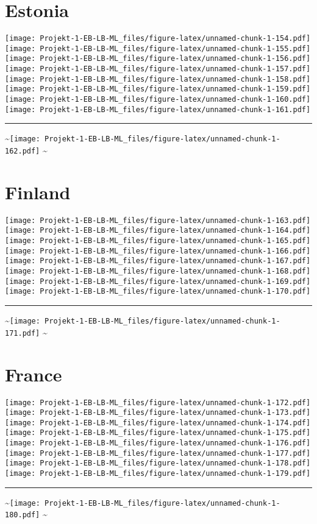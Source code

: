 \documentclass[]{article}
\begin{document}
\section{Estonia}\label{estonia}

\texttt{[image: Projekt-1-EB-LB-ML\_files/figure-latex/unnamed-chunk-1-154.pdf]}
\texttt{[image: Projekt-1-EB-LB-ML\_files/figure-latex/unnamed-chunk-1-155.pdf]}
\texttt{[image: Projekt-1-EB-LB-ML\_files/figure-latex/unnamed-chunk-1-156.pdf]}
\texttt{[image: Projekt-1-EB-LB-ML\_files/figure-latex/unnamed-chunk-1-157.pdf]}
\texttt{[image: Projekt-1-EB-LB-ML\_files/figure-latex/unnamed-chunk-1-158.pdf]}
\texttt{[image: Projekt-1-EB-LB-ML\_files/figure-latex/unnamed-chunk-1-159.pdf]}
\texttt{[image: Projekt-1-EB-LB-ML\_files/figure-latex/unnamed-chunk-1-160.pdf]}
\texttt{[image: Projekt-1-EB-LB-ML\_files/figure-latex/unnamed-chunk-1-161.pdf]}
\bigskip\hrule\bigskip
\textasciitilde{}\hfill\texttt{[image: Projekt-1-EB-LB-ML\_files/figure-latex/unnamed-chunk-1-162.pdf]}
\hfill \textasciitilde{} \vfill\eject

\section{Finland}\label{finland}

\texttt{[image: Projekt-1-EB-LB-ML\_files/figure-latex/unnamed-chunk-1-163.pdf]}
\texttt{[image: Projekt-1-EB-LB-ML\_files/figure-latex/unnamed-chunk-1-164.pdf]}
\texttt{[image: Projekt-1-EB-LB-ML\_files/figure-latex/unnamed-chunk-1-165.pdf]}
\texttt{[image: Projekt-1-EB-LB-ML\_files/figure-latex/unnamed-chunk-1-166.pdf]}
\texttt{[image: Projekt-1-EB-LB-ML\_files/figure-latex/unnamed-chunk-1-167.pdf]}
\texttt{[image: Projekt-1-EB-LB-ML\_files/figure-latex/unnamed-chunk-1-168.pdf]}
\texttt{[image: Projekt-1-EB-LB-ML\_files/figure-latex/unnamed-chunk-1-169.pdf]}
\texttt{[image: Projekt-1-EB-LB-ML\_files/figure-latex/unnamed-chunk-1-170.pdf]}
\bigskip\hrule\bigskip
\textasciitilde{}\hfill\texttt{[image: Projekt-1-EB-LB-ML\_files/figure-latex/unnamed-chunk-1-171.pdf]}
\hfill \textasciitilde{} \vfill\eject

\section{France}\label{france}

\texttt{[image: Projekt-1-EB-LB-ML\_files/figure-latex/unnamed-chunk-1-172.pdf]}
\texttt{[image: Projekt-1-EB-LB-ML\_files/figure-latex/unnamed-chunk-1-173.pdf]}
\texttt{[image: Projekt-1-EB-LB-ML\_files/figure-latex/unnamed-chunk-1-174.pdf]}
\texttt{[image: Projekt-1-EB-LB-ML\_files/figure-latex/unnamed-chunk-1-175.pdf]}
\texttt{[image: Projekt-1-EB-LB-ML\_files/figure-latex/unnamed-chunk-1-176.pdf]}
\texttt{[image: Projekt-1-EB-LB-ML\_files/figure-latex/unnamed-chunk-1-177.pdf]}
\texttt{[image: Projekt-1-EB-LB-ML\_files/figure-latex/unnamed-chunk-1-178.pdf]}
\texttt{[image: Projekt-1-EB-LB-ML\_files/figure-latex/unnamed-chunk-1-179.pdf]}
\bigskip\hrule\bigskip
\textasciitilde{}\hfill\texttt{[image: Projekt-1-EB-LB-ML\_files/figure-latex/unnamed-chunk-1-180.pdf]}
\hfill \textasciitilde{} \vfill\eject
\end{document}
